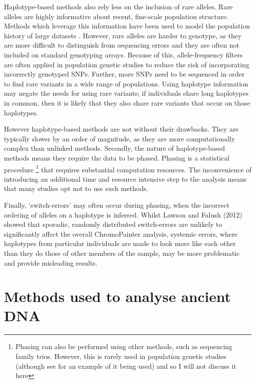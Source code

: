 Haplotype-based methods also rely less on the inclusion of rare alleles. Rare alleles are highly informative about recent, fine-scale population structure. Methods which leverage this information have been used to model the population history of large datasets \cite{schiffels2016iron, gravel2011demographic, o2015rare}. However, rare alleles are harder to genotype, as they are more difficult to distinguish from sequencing errors and they are often not included on standard genotyping arrays. Because of this, allele-frequency filters are often applied in population genetic studies to reduce the risk of incorporating incorrectly genotyped SNPs. Further, more SNPs need to be sequenced in order to find rare variants in a wide range of populations. Using haplotype information may negate the needs for using rare variants; if individuals share long haplotypes in common, then it is likely that they also share rare variants that occur on those haplotypes. 

However haplotype-based methods are not without their drawbacks. They are typically slower by an order of magnitude, as they are more computationally complex than unlinked methods. Secondly, the nature of haplotype-based methods means they require the data to be phased. Phasing is a statistical procedure \footnote{Phasing can also be performed using other methods, such as sequencing family trios. However, this is rarely used in population genetic studies (although see \cite{BergstromHGDP} for an example of it being used) and so I will not discuss it here} that requires substantial computation resources. The inconvenience of introducing an additional time and resource intensive step to the analysis means that many studies opt not to use such methods. 

Finally, `switch-errors' may often occur during phasing, when the incorrect ordering of alleles on a haplotype is inferred. Whilst Lawson and Falush (2012) showed that sporadic, randomly distributed switch-errors are unlikely to significantly affect the overall ChromoPainter analysis, systemic errors, where haplotypes from particular individuals are made to look more like each other than they do those of other members of the sample, may be more problematic and provide misleading results\cite{LawsonFalushReview}. 

\section{Methods used to analyse ancient DNA}

